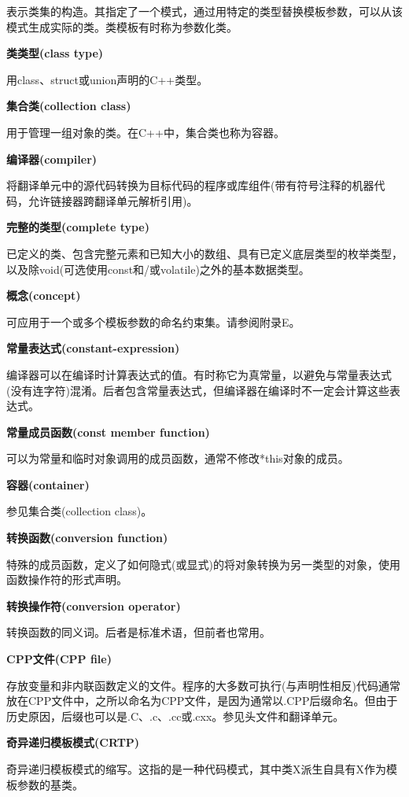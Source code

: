 表示类集的构造。其指定了一个模式，通过用特定的类型替换模板参数，可以从该模式生成实际的类。类模板有时称为参数化类。

\noindent
\textbf{类类型(class type)}

用class、struct或union声明的C++类型。

\noindent
\textbf{集合类(collection class)}

用于管理一组对象的类。在C++中，集合类也称为容器。

\noindent
\textbf{编译器(compiler)}

将翻译单元中的源代码转换为目标代码的程序或库组件(带有符号注释的机器代码，允许链接器跨翻译单元解析引用)。

\noindent
\textbf{完整的类型(complete type)}

已定义的类、包含完整元素和已知大小的数组、具有已定义底层类型的枚举类型，以及除void(可选使用const和/或volatile)之外的基本数据类型。

\noindent
\textbf{概念(concept)}

可应用于一个或多个模板参数的命名约束集。请参阅附录E。

\noindent
\textbf{常量表达式(constant-expression)}

编译器可以在编译时计算表达式的值。有时称它为真常量，以避免与常量表达式(没有连字符)混淆。后者包含常量表达式，但编译器在编译时不一定会计算这些表达式。

\noindent
\textbf{常量成员函数(const member function)}

可以为常量和临时对象调用的成员函数，通常不修改*this对象的成员。

\noindent
\textbf{容器(container)}

参见集合类(collection class)。

\noindent
\textbf{转换函数(conversion function)}

特殊的成员函数，定义了如何隐式(或显式)的将对象转换为另一类型的对象，使用函数操作符的形式声明。

\noindent
\textbf{转换操作符(conversion operator)}

转换函数的同义词。后者是标准术语，但前者也常用。

\noindent
\textbf{CPP文件(CPP file)}

存放变量和非内联函数定义的文件。程序的大多数可执行(与声明性相反)代码通常放在CPP文件中，之所以命名为CPP文件，是因为通常以.CPP后缀命名。但由于历史原因，后缀也可以是.C、.c、.cc或.cxx。参见头文件和翻译单元。

\noindent
\textbf{奇异递归模板模式(CRTP)}

奇异递归模板模式的缩写。这指的是一种代码模式，其中类X派生自具有X作为模板参数的基类。

